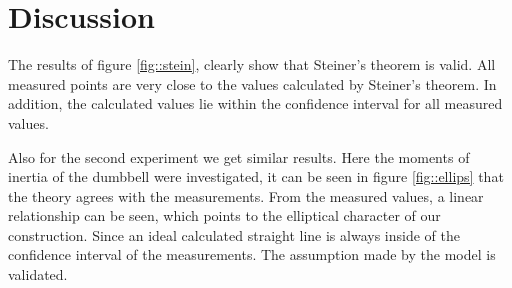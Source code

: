 \section{Discussion}
The results of figure \ref{fig::stein}, clearly show that Steiner's theorem is valid. All measured points are very close to the values calculated by Steiner's theorem. In addition, the calculated values lie within the confidence interval for all measured values.


Also for the second experiment we get similar results.
Here the moments of inertia of the dumbbell were investigated, it can be seen in figure \ref{fig::ellips} that the theory agrees with the measurements. 
From the measured values, a linear relationship can be seen, which points to the elliptical character of our construction.
Since an ideal calculated straight line is always inside of the confidence interval of the measurements.
The assumption made by the model is validated.


